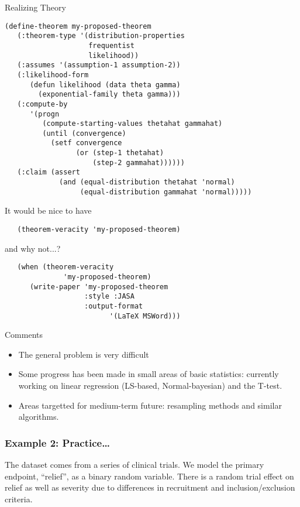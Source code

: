 \documentclass{beamer}
\begin{document}
\begin{frame}[fragile]{Realizing Theory}
  \small{
\begin{verbatim}  
(define-theorem my-proposed-theorem
   (:theorem-type '(distribution-properties
                    frequentist
                    likelihood))
   (:assumes '(assumption-1 assumption-2))
   (:likelihood-form
      (defun likelihood (data theta gamma)
        (exponential-family theta gamma)))
   (:compute-by
      '(progn
         (compute-starting-values thetahat gammahat)
         (until (convergence)
           (setf convergence
                 (or (step-1 thetahat)
                     (step-2 gammahat))))))
   (:claim (assert 
             (and (equal-distribution thetahat 'normal)
                  (equal-distribution gammahat 'normal)))))
\end{verbatim}
  }
\end{frame}

\begin{frame}[fragile]{It would be nice to have}
\begin{verbatim}
   (theorem-veracity 'my-proposed-theorem)
\end{verbatim}
\end{frame}

\begin{frame}[fragile]{and why not...?}
\begin{verbatim}
   (when (theorem-veracity
              'my-proposed-theorem)
      (write-paper 'my-proposed-theorem
                   :style :JASA
                   :output-format
                         '(LaTeX MSWord)))
\end{verbatim}
\end{frame}

\begin{frame}{Comments}
  \begin{itemize}
  \item The general problem is very difficult
  \item Some progress has been made in small areas of basic
    statistics: currently working on linear regression (LS-based,
    Normal-bayesian) and the T-test.
  \item Areas targetted for medium-term future: resampling methods and
    similar algorithms.
  \end{itemize}

\end{frame}

\begin{frame}
  \frametitle{Example 2: Practice\ldots} 
  \label{example2}
  The dataset comes from a series of clinical trials.  We model the
  primary endpoint, ``relief'', as a binary random variable.  There is
  a random trial effect on relief as well as severity due to
  differences in recruitment and inclusion/exclusion criteria.
\end{frame}
\end{document}
